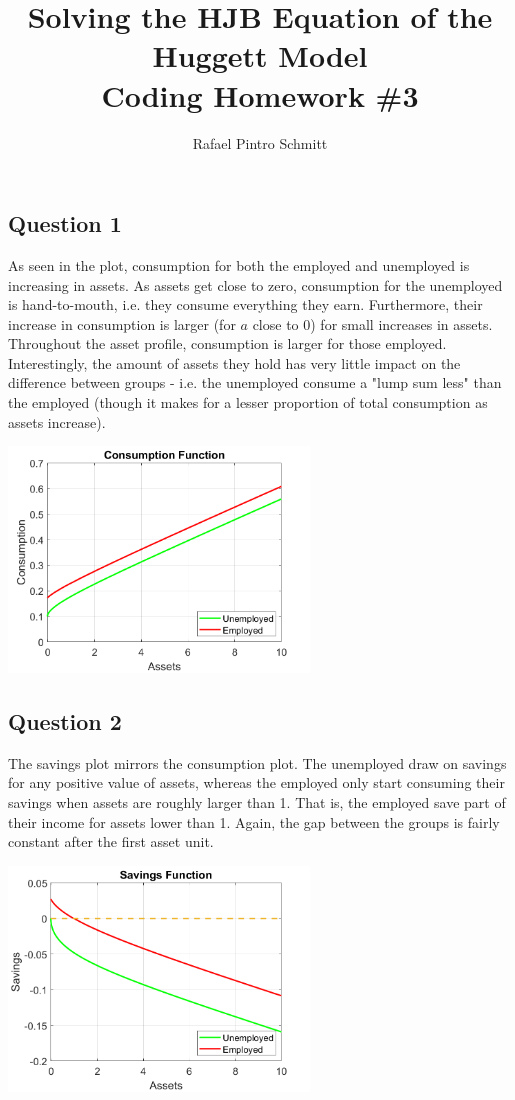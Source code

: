 \documentclass{article}
\title{Solving the HJB Equation of the Huggett Model\\[5pt] {\Large \textbf{Coding Homework \#3}}}
\author{Rafael Pintro Schmitt}
\date{}
\begin{document}
\maketitle 

\subsection*{Question 1}
As seen in the plot, consumption for both the employed and unemployed is increasing in assets. As assets get close to zero, consumption for the unemployed is hand-to-mouth, i.e. they consume everything they earn. Furthermore, their increase in consumption is larger (for $a$ close to 0) for small increases in assets. Throughout the asset profile, consumption is larger for those employed. Interestingly, the amount of assets they hold has very little impact on the difference between groups - i.e. the unemployed consume a "lump sum less" than the employed (though it makes for a lesser proportion of total consumption as assets increase).\\
\begin{center}
\includegraphics[width=0.6\textwidth]{homework/Solutions/homework_3_coding/consumption_vs_assets.png}
\end{center}

\subsection*{Question 2}
The savings plot mirrors the consumption plot. The unemployed draw on savings for any positive value of assets, whereas the employed only start consuming their savings when assets are roughly larger than 1. That is, the employed save part of their income for assets lower than 1. Again, the gap between the groups is fairly constant after the first asset unit.\\
\begin{center}
\includegraphics[width=0.6\textwidth]{homework/Solutions/homework_3_coding/savings_vs_assets.png}
\end{center}
\end{document}
